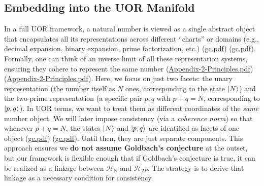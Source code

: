 \documentclass[12pt]{article}
\begin{document}
\subsection{Embedding into the UOR Manifold}
In a full UOR framework, a natural number is viewed as a single abstract object that encapsulates all its representations across different ``charts'' or domains (e.g., decimal expansion, binary expansion, prime factorization, etc.) (\href{file://file-7ZYYwSHWVa83XEVTrEhg5z#:~:text=framework%20%28Appendix,encode%20one%20possible}{gc.pdf}) (\href{file://file-7ZYYwSHWVa83XEVTrEhg5z#:~:text=decomposition%20of%20that%20number,ensuring%20consistency}{gc.pdf}). Formally, one can think of an inverse limit of all these representation systems, ensuring they cohere to represent the same number (\href{file://file-TfNUqeKofDhk2Y2hbijWtk#:~:text=,}{Appendix-2-Principles.pdf}) (\href{file://file-TfNUqeKofDhk2Y2hbijWtk#:~:text=expansions%20to%20measure%20their%20consistency%3A,the%20set%20of%20all%20consistent}{Appendix-2-Principles.pdf}). Here, we focus on just two facets: the unary representation (the number itself as $N$ ones, corresponding to the state $\ket{N}$) and the two-prime representation (a specific pair $p,q$ with $p+q=N$, corresponding to $\ket{p,q}$). In UOR terms, we want to treat them as different coordinates of the \textit{same} number object. We will later impose consistency (via a \textit{coherence norm}) so that whenever $p+q=N$, the states $\ket{N}$ and $\ket{p,q}$ are identified as facets of one object (\href{file://file-7ZYYwSHWVa83XEVTrEhg5z#:~:text=representation%20will%20be%20reflected%20as,H%7D%24%20for%20that%20%24N}{gc.pdf}) (\href{file://file-7ZYYwSHWVa83XEVTrEhg5z#:~:text=expansions%2C%20etc.%29%20%28Appendix,encode%20one%20possible}{gc.pdf}). Until then, they are just separate components. This approach ensures we \textbf{do not assume Goldbach’s conjecture} at the outset, but our framework is flexible enough that if Goldbach’s conjecture is true, it can be realized as a linkage between $\mathcal{H}_{\mathbb{N}}$ and $\mathcal{H}_{2P}$. The strategy is to derive that linkage as a necessary condition for consistency.
\end{document}

